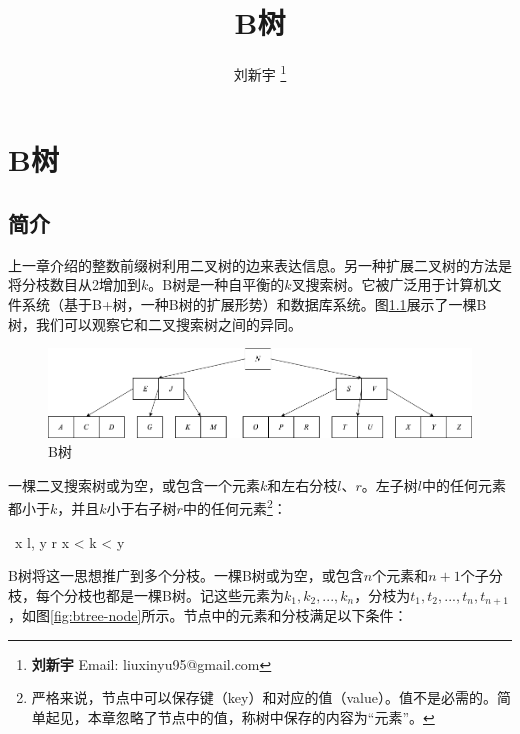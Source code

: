 \documentclass{ctexart}
\begin{document}
\title{B树}

\author{刘新宇
\thanks{{\bfseries 刘新宇 } \newline
  Email: liuxinyu95@gmail.com \newline}
  }

\maketitle
\fi


\ifx\wholebook\relax
\chapter{B树}
\fi

\section{简介}
\label{introduction}

上一章介绍的整数前缀树利用二叉树的边来表达信息。另一种扩展二叉树的方法是将分枝数目从2增加到$k$。B树是一种自平衡的$k$叉搜索树\cite{wiki-b-tree}。它被广泛用于计算机文件系统（基于B+树，一种B树的扩展形势）和数据库系统。图\ref{fig:btree-example}展示了一棵B树，我们可以观察它和二叉搜索树之间的异同。

\begin{figure}[htbp]
  \centering
  \includegraphics[scale=0.33]{img/btree-del-before.png}
  \caption{B树}
  \label{fig:btree-example}
\end{figure}

一棵二叉搜索树或为空，或包含一个元素$k$和左右分枝$l$、$r$。左子树$l$中的任何元素都小于$k$，并且$k$小于右子树$r$中的任何元素\footnote{严格来说，节点中可以保存键（key）和对应的值（value）。值不是必需的。简单起见，本章忽略了节点中的值，称树中保存的内容为“元素”。}：

\be
\forall\ x \in l, y \in r \Rightarrow x < k < y
\ee

B树将这一思想推广到多个分枝。一棵B树或为空，或包含$n$个元素和$n + 1$个子分枝，每个分枝也都是一棵B树。记这些元素为$k_1, k_2, ..., k_n$，分枝为$t_1, t_2, ..., t_n, t_{n+1}$，如图\ref{fig:btree-node}所示。节点中的元素和分枝满足以下条件：
\end{document}
